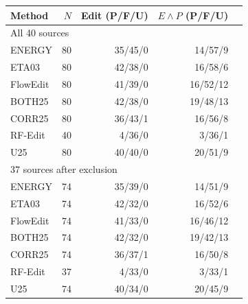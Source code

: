 \begin{tabular}{lrrrr}
\hline
Method & $N$ & Edit (P/F/U) & $E\wedge P$ (P/F/U) \\
\hline
\multicolumn{4}{l}{All 40 sources} \\
ENERGY & 80 & 35/45/0 & 14/57/9 \\
ETA03 & 80 & 42/38/0 & 16/58/6 \\
FlowEdit & 80 & 41/39/0 & 16/52/12 \\
BOTH25 & 80 & 42/38/0 & 19/48/13 \\
CORR25 & 80 & 36/43/1 & 16/56/8 \\
RF-Edit & 40 & 4/36/0 & 3/36/1 \\
U25 & 80 & 40/40/0 & 20/51/9 \\
\multicolumn{4}{l}{37 sources after exclusion} \\
ENERGY & 74 & 35/39/0 & 14/51/9 \\
ETA03 & 74 & 42/32/0 & 16/52/6 \\
FlowEdit & 74 & 41/33/0 & 16/46/12 \\
BOTH25 & 74 & 42/32/0 & 19/42/13 \\
CORR25 & 74 & 36/37/1 & 16/50/8 \\
RF-Edit & 37 & 4/33/0 & 3/33/1 \\
U25 & 74 & 40/34/0 & 20/45/9 \\
\hline
\end{tabular}
